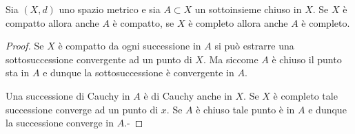 \begin{theorem}
Sia $(X,d)$ uno spazio metrico e sia $A\subset X$ un sottoinsieme chiuso in $X$. Se $X$ è compatto allora anche $A$ è compatto, se $X$ è completo allora anche $A$ è completo.
\end{theorem}
\begin{proof}
Se $X$ è compatto da ogni successione in $A$ si può estrarre una sottosuccessione convergente ad un punto di $X$. Ma siccome $A$ è chiuso il punto sta in $A$ e dunque la sottosuccessione è convergente in $A$.

Una successione di Cauchy in $A$ è di Cauchy anche in $X$. Se $X$ è completo tale successione converge ad un punto di $x$. Se $A$ è chiuso tale punto è in $A$ e dunque la successione converge in $A$.-
\end{proof}

